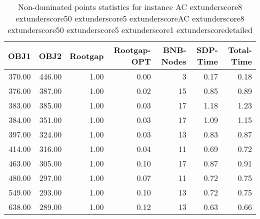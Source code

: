 \begin{table}
\caption{Non-dominated points statistics for instance AC	extunderscore8	extunderscore50	extunderscore5	extunderscoreAC	extunderscore8	extunderscore50	extunderscore5	extunderscore1	extunderscoredetailed}
\label{tab:stats/AC_8_50_5_AC_8_50_5_1_detailed}
\begin{tabular}{rrrrrrr}
\toprule
OBJ1 & OBJ2 & Rootgap & Rootgap-OPT & BNB-Nodes & SDP-Time & Total-Time \\
\midrule
370.00 & 446.00 & 1.00 & 0.00 & 3 & 0.17 & 0.18 \\
376.00 & 387.00 & 1.00 & 0.02 & 15 & 0.85 & 0.89 \\
383.00 & 385.00 & 1.00 & 0.03 & 17 & 1.18 & 1.23 \\
384.00 & 351.00 & 1.00 & 0.03 & 17 & 1.09 & 1.15 \\
397.00 & 324.00 & 1.00 & 0.03 & 13 & 0.83 & 0.87 \\
414.00 & 316.00 & 1.00 & 0.04 & 11 & 0.69 & 0.72 \\
463.00 & 305.00 & 1.00 & 0.10 & 17 & 0.87 & 0.91 \\
480.00 & 297.00 & 1.00 & 0.07 & 11 & 0.72 & 0.75 \\
549.00 & 293.00 & 1.00 & 0.10 & 13 & 0.72 & 0.75 \\
638.00 & 289.00 & 1.00 & 0.12 & 13 & 0.63 & 0.66 \\
\bottomrule
\end{tabular}
\end{table}
